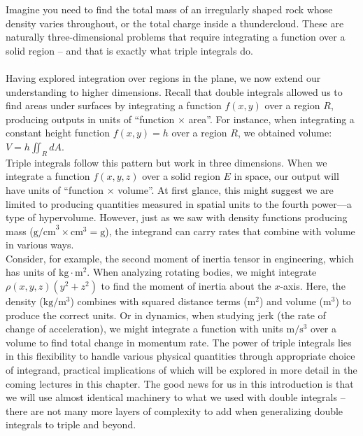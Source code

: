 \newpage



\noindent Imagine you need to find the total mass of an irregularly shaped rock whose density varies throughout, or the total charge inside a thundercloud. These are naturally three-dimensional problems that require integrating a function over a solid region -- and that is exactly what triple integrals do.\\ \\

\noindent Having explored integration over regions in the plane, we now extend our understanding to higher dimensions. Recall that double integrals allowed us to find areas under surfaces by integrating a function $f(x,y)$ over a region $R$, producing outputs in units of ``function $\times$ area''. For instance, when integrating a constant height function $f(x,y) = h$ over a region $R$, we obtained volume: $V = h\iint_R dA$. \\

\noindent Triple integrals follow this pattern but work in three dimensions. When we integrate a function $f(x,y,z)$ over a solid region $E$ in space, our output will have units of ``function $\times$ volume''. At first glance, this might suggest we are limited to producing quantities measured in spatial units to the fourth power—a type of hypervolume. However, just as we saw with density functions producing mass ($\text{g/cm}^3 \times \text{cm}^3 = \text{g}$), the integrand can carry rates that combine with volume in various ways. \\

\noindent Consider, for example, the second moment of inertia tensor in engineering, which has units of $\text{kg}\cdot\text{m}^2$. When analyzing rotating bodies, we might integrate $\rho(x,y,z)(y^2 + z^2)$ to find the moment of inertia about the $x$-axis. Here, the density ($\text{kg}/\text{m}^3$) combines with squared distance terms ($\text{m}^2$) and volume ($\text{m}^3$) to produce the correct units. Or in dynamics, when studying jerk (the rate of change of acceleration), we might integrate a function with units $\text{m}/\text{s}^3$ over a volume to find total change in momentum rate. The power of triple integrals lies in this flexibility to handle various physical quantities through appropriate choice of integrand, practical implications of which will be explored in more detail in the coming lectures in this chapter. The good news for us in this introduction is that we will use almost identical machinery to what we used with double integrals -- there are not many more layers of complexity to add when generalizing double integrals to triple and beyond.


